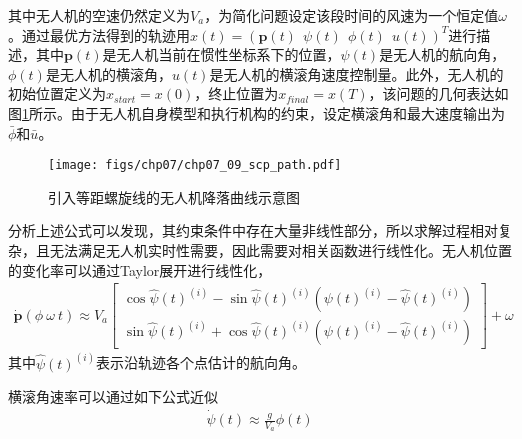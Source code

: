 其中无人机的空速仍然定义为$V_a$，为简化问题设定该段时间的风速为一个恒定值$\omega$。通过最优方法得到的轨迹用$x(t) = (\mathbf{p}(t)\ \ \psi(t)\ \ \phi(t)\ \ u(t) )^T$进行描述，其中$\mathbf{p}(t)$是无人机当前在惯性坐标系下的位置，$\psi(t)$是无人机的航向角，$\phi(t)$是无人机的横滚角，$u(t)$是无人机的横滚角速度控制量。此外，无人机的初始位置定义为$x_{start}=x(0)$，终止位置为$x_{final}=x(T)$，该问题的几何表达如图\ref{fig:chp07_09_scp_path}所示。由于无人机自身模型和执行机构的约束，设定横滚角和最大速度输出为$\bar{\phi}$和$\bar{u}$。
\begin{figure}[ht]   
	\centering
	\texttt{[image: figs/chp07/chp07\_09\_scp\_path.pdf]}
	\caption{引入等距螺旋线的无人机降落曲线示意图}
	\label{fig:chp07_09_scp_path}
\end{figure}

分析上述公式可以发现，其约束条件中存在大量非线性部分，所以求解过程相对复杂，且无法满足无人机实时性需要，因此需要对相关函数进行线性化。无人机位置的变化率可以通过Taylor展开进行线性化，
\begin{align} {\dot{\mathbf{p}}(\phi\ \omega\ t) \approx {V}_a \begin{bmatrix} \cos \hat{\psi}(t)^{(i)} - \sin\hat{\psi}(t)^{(i)} ({\psi}(t)^{(i)} - \hat{\psi}(t)^{(i)}) \\ \sin \hat{\psi}(t)^{(i)}+ \cos \hat{\psi}(t)^{(i)}({\psi}(t)^{(i)} - \hat{\psi}(t)^{(i)})  \end{bmatrix} + \omega}
\end{align}
其中$\hat{\psi}(t)^{(i)}$表示沿轨迹各个点估计的航向角。

横滚角速率可以通过如下公式近似
\begin{align}
\dot{\psi}(t) \approx \frac{g}{V_a} \phi(t)
\end{align}

